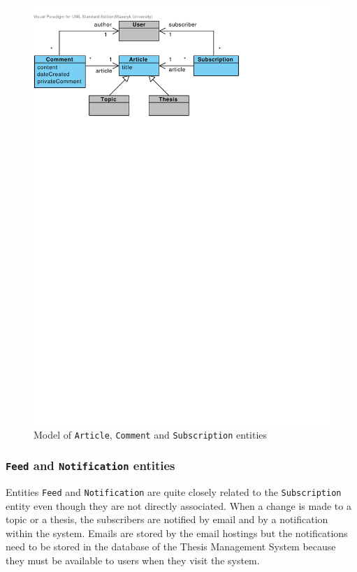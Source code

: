 \begin{figure}[h]
    \centering
        \includegraphics[trim=0 620 180 30, clip, keepaspectratio, width=\textwidth]{./images/domain-article-comment-subscription-entities.pdf}
    \caption{Model of \texttt{Article}, \texttt{Comment} and \texttt{Subscription} entities}
    \label{fig:domain-article-comment-subscription-entities}
\end{figure}

\subsubsection{\texttt{Feed} and \texttt{Notification} entities}

Entities \texttt{Feed} and \texttt{Notification} are quite closely related to the \texttt{Subscription} entity even though they are not directly associated. When a change is made to a topic or a thesis, the subscribers are notified by email and by a notification within the system. Emails are stored by the email hostings but the notifications need to be stored in the database of the Thesis Management System because they must be available to users when they visit the system.

